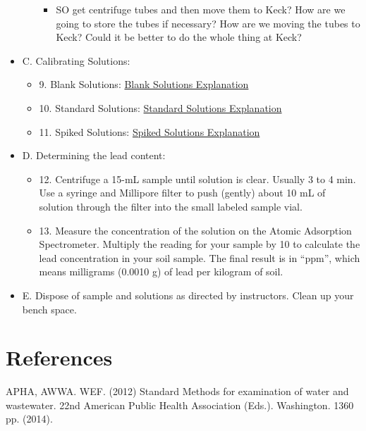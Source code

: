 \documentclass[12pt]{../SOP2}
\begin{document}
\begin{itemize}
\begin{itemize}
    \begin{itemize}
      \item SO get centrifuge tubes and then move them to Keck?
  How are we going to store the tubes if necessary?
  How are we moving the tubes to Keck?
  Could it be better to do the whole thing at Keck?
    \end{itemize}  
  \end{itemize}
  \item C. Calibrating Solutions:
  \begin{itemize}
    \item 9. Blank Solutions: \href{https://en.wikipedia.org/wiki/Blank_(solution)}{Blank Solutions Explanation}
    \item 10. Standard Solutions: \href{https://en.wikipedia.org/wiki/Standard_solution}{Standard Solutions Explanation}
    \item 11. Spiked Solutions: \href{}{Spiked Solutions Explanation}
  \end{itemize}  
  \item D. Determining the lead content:
  \begin{itemize}
    \item 12. Centrifuge a 15-mL sample until solution is clear. Usually 3 to 4 min. Use a syringe and Millipore filter to push (gently) about 10 mL of solution through the filter into the small labeled sample vial.
    \item 13. Measure the concentration of the solution on the Atomic Adsorption Spectrometer.  Multiply the reading for your sample by 10 to calculate the lead concentration in your soil sample.  The final result is in “ppm”, which means milligrams (0.0010 g) of lead per kilogram of soil.
  \end{itemize}
  \item E. Dispose of sample and solutions as directed by instructors. Clean up your bench space.
\end{itemize}


\section{References}

\NP APHA, AWWA. WEF. (2012) Standard Methods for examination of water and wastewater. 22nd American Public Health Association (Eds.). Washington. 1360 pp. (2014).
\end{document}
